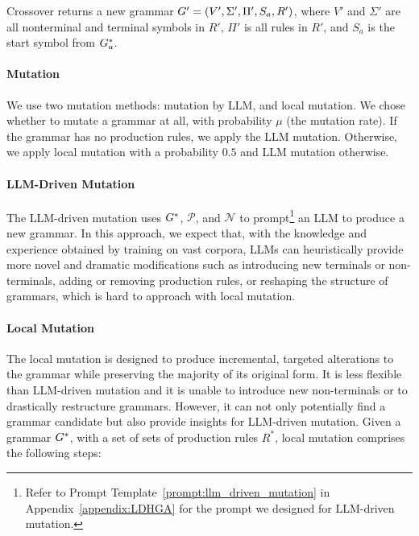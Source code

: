 Crossover returns a new grammar $G' = (V', \Sigma', \Pi', S_a, R')$, where $V'$ and $\Sigma'$ are all nonterminal and terminal symbols in $R'$, $\Pi'$ is all rules in $R'$, and $S_a$ is the start symbol from $G^*_a$.


\paragraph{Mutation}
We use two mutation methods: mutation by LLM, and local mutation. 
We chose whether to mutate a grammar at all, with probability $\mu$ (the mutation rate). If the grammar has no production rules, we apply the LLM mutation. Otherwise, we apply local mutation with a probability $0.5$ and LLM mutation otherwise. 



\paragraph{LLM-Driven Mutation}
The LLM-driven mutation 
uses $G^*$, $\mathcal{P}$, and $\mathcal{N}$ to prompt\footnote{Refer to Prompt Template~\ref{prompt:llm_driven_mutation} in Appendix~\ref{appendix:LDHGA} for the prompt we designed for LLM-driven mutation.} an LLM to produce a new grammar. In this approach, we expect that, with the knowledge and experience obtained by training on vast corpora, LLMs can heuristically provide more novel and dramatic modifications such as introducing new terminals or non-terminals, adding or removing production rules, or reshaping the structure of grammars, which is hard to approach with local mutation.

\paragraph{Local Mutation}
The local mutation is designed to produce incremental, targeted alterations to the grammar while preserving the majority of its original form. It is less flexible than LLM-driven mutation and it is unable to introduce new non-terminals or to drastically restructure grammars. However, it can not only potentially find a grammar candidate but also provide insights for LLM-driven mutation. Given a grammar $G^*$, with a set of sets of production rules $R^*$, local mutation comprises the following steps:

